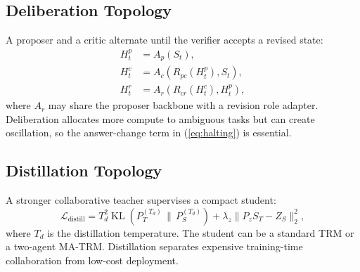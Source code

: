 \documentclass[10pt,a4paper,twocolumn]{article}
\newcommand{\KL}{\operatorname{KL}}
\newcommand{\MA}{\textsc{MA-TRM}}
\begin{document}
\subsection{Deliberation Topology}
A proposer and a critic alternate until the verifier accepts a revised state:
\begin{align}
H_t^{p} &= A_p(S_t),\\
H_t^{c} &= A_c(R_{pc}(H_t^{p}),S_t),\\
H_t^{r} &= A_r(R_{cr}(H_t^{c}),H_t^{p}), \label{eq:deliberation}
\end{align}
where $A_r$ may share the proposer backbone with a revision role adapter. Deliberation allocates more compute to ambiguous tasks but can create oscillation, so the answer-change term in (\ref{eq:halting}) is essential.

\subsection{Distillation Topology}
A stronger collaborative teacher supervises a compact student:
\begin{equation}
\mathcal{L}_{\mathrm{distill}}=T_d^2\KL\!\left(P_T^{(T_d)}\,\|\,P_S^{(T_d)}\right)+\lambda_z\|P_zS_T-Z_S\|_2^2, \label{eq:distill}
\end{equation}
where $T_d$ is the distillation temperature. The student can be a standard TRM or a two-agent \MA. Distillation separates expensive training-time collaboration from low-cost deployment.
\end{document}
